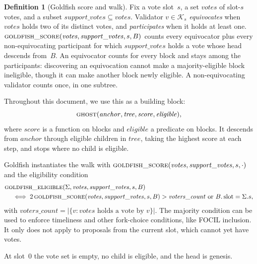 \documentclass{article}
\theoremstyle{plain}
\theoremstyle{definition}
\newtheorem{definition}{Definition}
\theoremstyle{remark}
\newcommand{\slot}{\operatorname{slot}}
\newcommand{\committee}{\mathcal K}
\newcommand{\fname}[1]{\text{\textsc{#1}}}
\begin{document}
\begin{definition}[Goldfish score and walk]\label{def:goldfish-walk}
Fix a vote slot~$s$, a set $\mathit{votes}$ of slot-$s$ votes, and a subset
$\mathit{support\_votes}\subseteq\mathit{votes}$.
Validator $v\in\committee_s$ \emph{equivocates} when
$\mathit{votes}$ holds two of its distinct votes, and \emph{participates}
when it holds at least one.
$\Call{goldfish\_score}{\mathit{votes},\mathit{support\_votes},s,B}$ counts
every equivocator plus every non-equivocating participant for which
$\mathit{support\_votes}$ holds a vote whose head descends from~$B$.  An
equivocator counts for every block and stays among the participants:
discovering an equivocation cannot make a majority-eligible block
ineligible, though it can make another block newly eligible.  A non-equivocating validator counts
once, in one subtree.

Throughout this document, we use this as a building block:
\[
 \Call{ghost}
 {\mathit{anchor},\mathit{tree},\mathit{score},\mathit{eligible}},
\]
where $\mathit{score}$ is a function on blocks and $\mathit{eligible}$ a
predicate on blocks.  It descends from $\mathit{anchor}$ through eligible
children in $\mathit{tree}$, taking the highest score at each step, and stops
where no child is eligible.

Goldfish instantiates the walk with
$\fname{goldfish\_score}(\mathit{votes},\mathit{support\_votes},s,\cdot)$
and the eligibility
condition
\[
\begin{aligned}
 &\Call{goldfish\_eligible}{\Sigma,\mathit{votes},
   \mathit{support\_votes},s,B}\\
 &\quad\iff 2\,\Call{goldfish\_score}{\mathit{votes},
   \mathit{support\_votes},s,B}>\mathit{voters\_count}\text{ or }B.\slot=\Sigma.s,
\end{aligned}
\]
with $\mathit{voters\_count}=
|\{v:\mathit{votes}\text{ holds a vote by }v\}|$.
The majority condition can be used to enforce timeliness and other fork-choice conditions, like FOCIL inclusion. It only does not apply to
proposals from the current slot, which cannot yet have votes.
\end{definition}

At slot~$0$ the vote set is empty, no child is eligible, and the head is
genesis.
\end{document}
